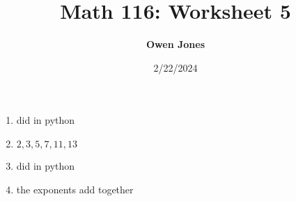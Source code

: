 \documentclass[10pt]{article}
\title{\bf Math 116: Worksheet 5}
\date{2/22/2024}
\author{\bf Owen Jones}
\begin{document}
\maketitle
\begin{enumerate}
    \item did in python
    \item $2,3,5,7,11,13$
    \item did in python
    \item the exponents add together
\end{enumerate}

\end{document}
